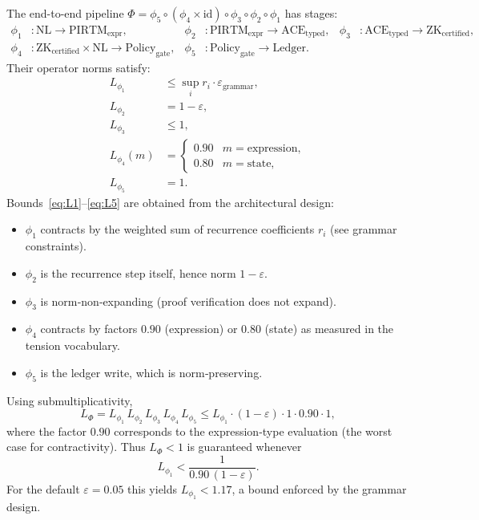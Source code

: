 \documentclass[11pt]{article}
\begin{document}
The end-to-end pipeline $\Phi = \phi_5\circ(\phi_4\times\mathrm{id})\circ\phi_3\circ\phi_2\circ\phi_1$
has stages:
\begin{align*}
    \phi_1&:\text{NL}\to\text{PIRTM}_{\text{expr}}, &
    \phi_2&:\text{PIRTM}_{\text{expr}}\to\text{ACE}_{\text{typed}}, &
    \phi_3&:\text{ACE}_{\text{typed}}\to\text{ZK}_{\text{certified}},\\
    \phi_4&:\text{ZK}_{\text{certified}}\times\text{NL}\to\text{Policy}_{\text{gate}}, &
    \phi_5&:\text{Policy}_{\text{gate}}\to\text{Ledger}.
\end{align*}
Their operator norms satisfy:
\begin{align}
    L_{\phi_1} &\le \sup_i r_i\cdot\varepsilon_{\text{grammar}}, \label{eq:L1}\\
    L_{\phi_2} &= 1-\varepsilon, \label{eq:L2}\\
    L_{\phi_3} &\le 1, \label{eq:L3}\\
    L_{\phi_4}(m) &=
    \begin{cases}
        0.90 & m=\text{expression},\\
        0.80 & m=\text{state},
    \end{cases} \label{eq:L4}\\
    L_{\phi_5} &= 1. \label{eq:L5}
\end{align}
Bounds~\eqref{eq:L1}--\eqref{eq:L5} are obtained from the architectural design:
\begin{itemize}
    \item $\phi_1$ contracts by the weighted sum of recurrence coefficients $r_i$ (see grammar constraints).
    \item $\phi_2$ is the recurrence step itself, hence norm $1-\varepsilon$.
    \item $\phi_3$ is norm‑non‑expanding (proof verification does not expand).
    \item $\phi_4$ contracts by factors $0.90$ (expression) or $0.80$ (state) as measured in the tension vocabulary.
    \item $\phi_5$ is the ledger write, which is norm‑preserving.
\end{itemize}
Using submultiplicativity,
\begin{equation}
    L_\Phi = L_{\phi_1}\,L_{\phi_2}\,L_{\phi_3}\,L_{\phi_4}\,L_{\phi_5}
           \le L_{\phi_1}\cdot(1-\varepsilon)\cdot 1\cdot 0.90\cdot 1,
\end{equation}
where the factor $0.90$ corresponds to the expression‑type evaluation (the worst case for contractivity).
Thus $L_\Phi<1$ is guaranteed whenever
\begin{equation}
    L_{\phi_1} < \frac{1}{0.90\,(1-\varepsilon)}.
\end{equation}
For the default $\varepsilon=0.05$ this yields $L_{\phi_1}<1.17$, a bound enforced by the grammar design.
\end{document}
